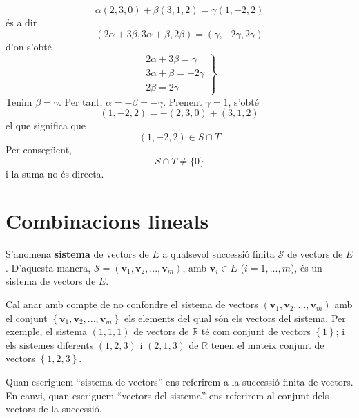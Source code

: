 \begin{solucio}
\begin{equation*}
\alpha (2,3,0)+\beta (3,1,2)=\gamma (1,-2,2)
\end{equation*}%
és a dir%
\begin{equation*}
(2\alpha +3\beta ,3\alpha +\beta ,2\beta )=(\gamma ,-2\gamma ,2\gamma )
\end{equation*}%
d’on s’obté%
\begin{equation*}
\left. 
\begin{array}{r}
2\alpha +3\beta =\gamma \\ 
3\alpha +\beta =-2\gamma \\ 
2\beta =2\gamma%
\end{array}%
\right\}
\end{equation*}%
Tenim $\beta =\gamma $. Per tant, $\alpha =-\beta =-\gamma $. Prenent $%
\gamma =1$, s’obté%
\begin{equation*}
(1,-2,2)=-(2,3,0)+(3,1,2)
\end{equation*}%
el que significa que%
\begin{equation*}
(1,-2,2)\in S\cap T
\end{equation*}%
Per consegüent,%
\begin{equation*}
S\cap T\neq \{0\}
\end{equation*}%
i la suma no és directa.
\end{solucio}

\section{Combinacions lineals}

\begin{definicio}
S’anomena \textbf{sistema} de vectors de $E$ a qualsevol successió finita $\mathcal{S}$ de vectors de $E$. D’aquesta manera, $\mathcal{S%
}=(\mathbf{v}_{1},\mathbf{v}_{2},...,\mathbf{v}_{m})$, amb $\mathbf{v}%
_{i}\in E$ ($i=1,...,m$), és un sistema de vectors de $E$.
\end{definicio}

\begin{observacio}
Cal anar amb compte de no confondre el sistema de vectors $(\mathbf{v}%
_{1},\mathbf{v}_{2},...,\mathbf{v}_{m})$ amb el conjunt $\left\{ \mathbf{v}%
_{1},\mathbf{v}_{2},...,\mathbf{v}_{m}\right\} $ els elements del qual són els
vectors del sistema. Per exemple, el sistema $(1,1,1)$ de vectors de $%
\mathbb{R}$ té com conjunt de vectors $\left\{ 1\right\} $; i els
sistemes diferents $(1,2,3)$ i $(2,1,3)$ de $\mathbb{R}$ tenen el mateix
conjunt de vectors $\left\{ 1,2,3\right\} $.

Quan escriguem ``sistema de vectors'' ens referirem a la successió
finita de vectors. En canvi, quan escriguem ``vectors del sistema''
ens referirem al conjunt dels vectors de la successió.
\end{observacio}

